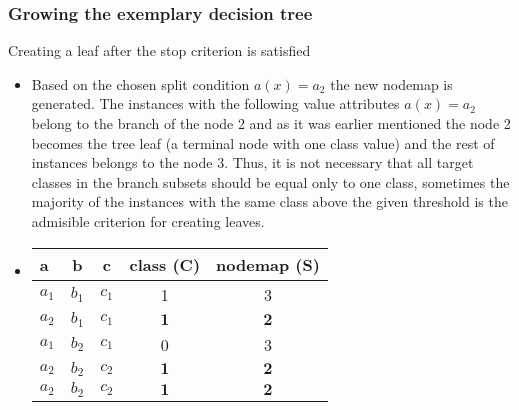 \documentclass[smaller, proffesionalfonts]{beamer}
\def\bm{\boldsymbol}
\begin{document}
\begin{frame}
\frametitle{Growing the exemplary decision tree}
\begin{block}{Creating a leaf after the stop criterion is satisfied}
\begin{itemize}
\item
\justifying
Based on the chosen split condition $a(x)=a_2$ the new nodemap is generated. The instances with the following value attributes $a(x)=a_2$ belong to the branch of the node 2 and as it was earlier mentioned the node 2 becomes the tree leaf (a terminal node with one class value) and the rest of instances belongs to the node 3. Thus, it is not necessary that all target classes in the branch subsets should be equal only to one class, sometimes the majority of the instances with the same class above the given threshold is the admisible criterion for creating leaves. 
\item
\begin{center}
{\sf
   \begin{tabular}{|p{3mm}||c|c||c||c|}
   \hline 
   a & b & c & class (C) & nodemap (S)\\
   \hline
   \hline
    $a_1$ & $b_1$ & $c_1$ & 1 & 3 \\
   \hline
    $a_2$ & $b_1$ & $c_1$ & $\bm 1$ & $\bm 2$ \\
   \hline
    $a_1$ & $b_2$ & $c_1$ & 0 & 3 \\
   \hline
    $a_2$ & $b_2$ & $c_2$ & $\bm 1$ & $\bm 2$ \\
   \hline
    $a_2$ & $b_2$ & $c_2$ & $\bm 1$ & $\bm 2$ \\
   \hline
   \end{tabular}
}
\end{center}
\end{itemize}
\end{block}
\end{frame}
\end{document}
